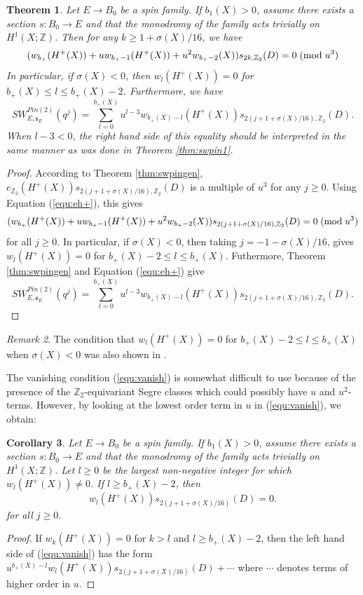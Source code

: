 \documentclass{amsart}
\newtheorem{theorem}{Theorem}[section]
\newtheorem{corollary}[theorem]{Corollary}
\theoremstyle{definition}
\theoremstyle{remark}
\newtheorem{remark}[theorem]{Remark}
\numberwithin{equation}{section}
\begin{document}
\begin{theorem}\label{thm:spinfam1}
Let $E \to B_0$ be a spin family. If $b_1(X) > 0$, assume there exists a section $s : B_0 \to E$ and that the monodromy of the family acts trivially on $H^1(X ; \mathbb{Z})$. Then for any $k \ge 1+\sigma(X)/16$, we have
\begin{equation}\label{equ:vanish}
(w_{b_+}(H^+(X)) + u w_{b_+-1}(H^+(X)) + u^2 w_{b_+-2}(X) ) s_{2k,\mathbb{Z}_2}(D) = 0 \; ({\rm mod} \; u^3)
\end{equation}
In particular, if $\sigma(X) < 0$, then $w_l(H^+(X)) = 0$ for $b_+(X) \le l \le b_+(X)-2$. Furthermore, we have
\[
SW^{Pin(2)}_{E,\mathfrak{s}_E}(q^j) = \sum_{l=0}^{b_+(X)} u^{l-3} w_{b_+(X)-l}(H^+(X)) s_{2(j+1+\sigma(X)/16) , \mathbb{Z}_2}(D).
\]
When $l-3 < 0$, the right hand side of this equality should be interpreted in the same manner as was done in Theorem \ref{thm:swpin1}.
\end{theorem}
\begin{proof}
According to Theorem \ref{thm:swpingen}, $e_{\mathbb{Z}_2}(H^+(X))s_{2(j+1+\sigma(X)/16), \mathbb{Z}_2}(D)$ is a multiple of $u^3$ for any $j \ge 0$. Using Equation (\ref{equ:eh+}), this gives
\[
(w_{b_+}(H^+(X)) + u w_{b_+-1}(H^+(X)) + u^2 w_{b_+-2}(X) ) s_{2(j+1+\sigma(X)/16),\mathbb{Z}_2}(D) = 0 \; ({\rm mod} \; u^3)
\]
for all $j \ge 0$. In particular, if $\sigma(X) < 0$, then taking $j = -1 -\sigma(X)/16$, gives $w_l(H^+(X)) = 0$ for $b_+(X) - 2 \le l \le b_+(X)$. Futhermore, Theorem \ref{thm:swpingen} and Equation (\ref{equ:eh+}) give
\[
SW^{Pin(2)}_{E,\mathfrak{s}_E}(q^j) = \sum_{l=0}^{b_+(X)} u^{l-3} w_{b_+(X)-l}(H^+(X)) s_{2(j+1+\sigma(X)/16),\mathbb{Z}_2}(D).
\]
\end{proof}

\begin{remark}
The condition that $w_l( H^+(X) ) = 0$ for $b_+(X)-2 \le l \le b_+(X)$ when $\sigma(X) < 0$ was also shown in \cite[Theorem 1.2]{bar}.
\end{remark}

The vanishing condition (\ref{equ:vanish}) is somewhat difficult to use because of the presence of the $\mathbb{Z}_2$-equivariant Segre classes which could possibly have $u$ and $u^2$-terms. However, by looking at the lowest order term in $u$ in (\ref{equ:vanish}), we obtain:

\begin{corollary}
Let $E \to B_0$ be a spin family. If $b_1(X) > 0$, assume there exists a section $s : B_0 \to E$ and that the monodromy of the family acts trivially on $H^1(X ; \mathbb{Z})$. Let $l \ge 0$ be the largest non-negative integer for which $w_l(H^+(X)) \neq 0$. If $l \ge b_+(X)-2$, then 
\[
w_l(H^+(X))s_{2(j+1+\sigma(X)/16)}(D) = 0.
\]
for all $j \ge 0$.
\end{corollary}
\begin{proof}
If $w_k(H^+(X)) = 0$ for $k > l$ and $l \ge b_+(X)-2$, then the left hand side of (\ref{equ:vanish}) has the form $u^{b_+(X)-l} w_l(H^+(X))s_{2(j+1+\sigma(X)/16)}(D) + \cdots $ where $\cdots$ denotes terms of higher order in $u$.
\end{proof}
\end{document}
